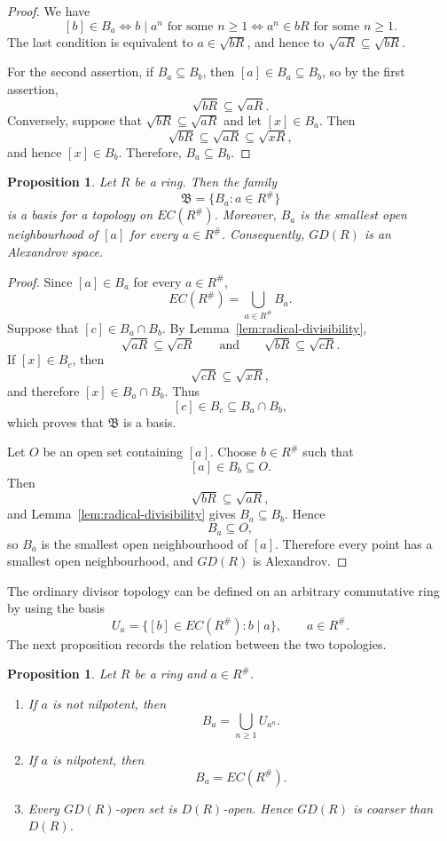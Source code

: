 \documentclass[11pt]{amsart}
\theoremstyle{plain}
\newtheorem{proposition}[theorem]{Proposition}
\theoremstyle{definition}
\theoremstyle{remark}
\numberwithin{equation}{section}
\begin{document}
\begin{proof}
	We have
	\[
	[b]\in B_a
	\Longleftrightarrow
	b\mid a^n \text{ for some }n\geq1
	\Longleftrightarrow
	a^n\in bR \text{ for some }n\geq1.
	\]
	The last condition is equivalent to $a\in\sqrt{bR}$, and hence to
	$\sqrt{aR}\subseteq\sqrt{bR}$.
	
	For the second assertion, if $B_a\subseteq B_b$, then
	$[a]\in B_a\subseteq B_b$, so by the first assertion,
	\[
	\sqrt{bR}\subseteq\sqrt{aR}.
	\]
	Conversely, suppose that
	$\sqrt{bR}\subseteq\sqrt{aR}$ and let $[x]\in B_a$. Then
	\[
	\sqrt{bR}\subseteq\sqrt{aR}\subseteq\sqrt{xR},
	\]
	and hence $[x]\in B_b$. Therefore, $B_a\subseteq B_b$.
\end{proof}

\begin{proposition}\label{prop:basis}
	Let $R$ be a ring. Then the family
	\[
	\mathfrak B=\{B_a:a\in R^\#\}
	\]
	is a basis for a topology on $EC(R^\#)$. Moreover, $B_a$ is the smallest
	open neighbourhood of $[a]$ for every $a\in R^\#$. Consequently, $GD(R)$
	is an Alexandrov space.
\end{proposition}

\begin{proof}
	Since $[a]\in B_a$ for every $a\in R^\#$,
	\[
	EC(R^\#)=\bigcup_{a\in R^\#}B_a.
	\]
	Suppose that $[c]\in B_a\cap B_b$. By
	Lemma~\ref{lem:radical-divisibility},
	\[
	\sqrt{aR}\subseteq\sqrt{cR}
	\qquad\text{and}\qquad
	\sqrt{bR}\subseteq\sqrt{cR}.
	\]
	If $[x]\in B_c$, then
	\[
	\sqrt{cR}\subseteq\sqrt{xR},
	\]
	and therefore $[x]\in B_a\cap B_b$. Thus
	\[
	[c]\in B_c\subseteq B_a\cap B_b,
	\]
	which proves that $\mathfrak B$ is a basis.
	
	Let $O$ be an open set containing $[a]$. Choose $b\in R^\#$ such that
	\[
	[a]\in B_b\subseteq O.
	\]
	Then
	\[
	\sqrt{bR}\subseteq\sqrt{aR},
	\]
	and Lemma~\ref{lem:radical-divisibility} gives $B_a\subseteq B_b$.
	Hence
	\[
	B_a\subseteq O,
	\]
	so $B_a$ is the smallest open neighbourhood of $[a]$. Therefore every
	point has a smallest open neighbourhood, and $GD(R)$ is Alexandrov.
\end{proof}

The ordinary divisor topology can be defined on an arbitrary commutative ring
by using the basis
\[
U_a=\{[b]\in EC(R^\#):b\mid a\},
\qquad a\in R^\#.
\]
The next proposition records the relation between the two topologies.

\begin{proposition}\label{prop:D-GD}
	Let $R$ be a ring and $a\in R^\#$.
	\begin{enumerate}
		\item If $a$ is not nilpotent, then
		\[
		B_a=\bigcup_{n\geq1}U_{a^n}.
		\]
		\item If $a$ is nilpotent, then
		\[
		B_a=EC(R^\#).
		\]
		\item Every $GD(R)$-open set is $D(R)$-open. Hence $GD(R)$ is coarser
		than $D(R)$.
	\end{enumerate}
\end{proposition}
\end{document}
